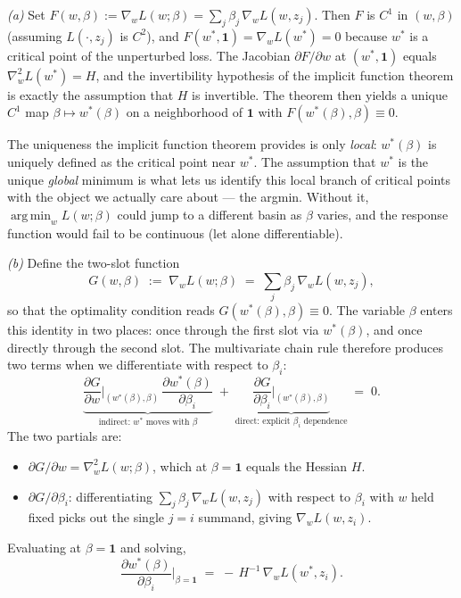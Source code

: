 \documentclass[11pt]{article}
\DeclareMathOperator*{\argmin}{arg\,min}
\begin{document}
\begin{solution}[ex:if-derive]

\textit{(a)} Set $F(w,\beta) := \nabla_w L(w;\beta) = \sum_j \beta_j\,\nabla_w L(w,z_j)$. Then $F$ is $C^1$ in $(w,\beta)$ (assuming $L(\cdot,z_j)$ is $C^2$), and $F(w^*,\mathbf{1}) = \nabla_w L(w^*) = 0$ because $w^*$ is a critical point of the unperturbed loss. The Jacobian $\partial F/\partial w$ at $(w^*,\mathbf{1})$ equals $\nabla_w^2 L(w^*) = H$, and the invertibility hypothesis of the implicit function theorem is exactly the assumption that $H$ is invertible. The theorem then yields a unique $C^1$ map $\beta\mapsto w^*(\beta)$ on a neighborhood of $\mathbf{1}$ with $F(w^*(\beta),\beta)\equiv 0$.

The uniqueness the implicit function theorem provides is only \emph{local}: $w^*(\beta)$ is uniquely defined as the critical point near $w^*$. The assumption that $w^*$ is the unique \emph{global} minimum is what lets us identify this local branch of critical points with the object we actually care about --- the argmin. Without it, $\argmin_w L(w;\beta)$ could jump to a different basin as $\beta$ varies, and the response function would fail to be continuous (let alone differentiable).

\textit{(b)} Define the two-slot function
\[
  G(w,\beta) \;:=\; \nabla_w L(w;\beta) \;=\; \sum_{j} \beta_j\,\nabla_w L(w,z_j),
\]
so that the optimality condition reads $G(w^*(\beta),\beta) \equiv 0$. The variable $\beta$ enters this identity in two places: once through the first slot via $w^*(\beta)$, and once directly through the second slot. The multivariate chain rule therefore produces two terms when we differentiate with respect to $\beta_i$:
\[
  \underbrace{\frac{\partial G}{\partial w}\bigg|_{(w^*(\beta),\beta)}\,\frac{\partial w^*(\beta)}{\partial \beta_i}}_{\text{indirect: } w^* \text{ moves with } \beta} \;+\; \underbrace{\frac{\partial G}{\partial \beta_i}\bigg|_{(w^*(\beta),\beta)}}_{\text{direct: explicit } \beta_i \text{ dependence}} \;=\; 0.
\]
The two partials are:
\begin{itemize}
  \item $\partial G/\partial w = \nabla_w^2 L(w;\beta)$, which at $\beta = \mathbf{1}$ equals the Hessian $H$.
  \item $\partial G/\partial \beta_i$: differentiating $\sum_j \beta_j\,\nabla_w L(w,z_j)$ with respect to $\beta_i$ with $w$ held fixed picks out the single $j=i$ summand, giving $\nabla_w L(w,z_i)$.
\end{itemize}
Evaluating at $\beta = \mathbf{1}$ and solving,
\[
  \frac{\partial w^*(\beta)}{\partial \beta_i}\bigg\rvert_{\beta=\mathbf{1}} \;=\; -\,H^{-1}\,\nabla_w L(w^*,z_i).
\]


\end{solution}
\end{document}
